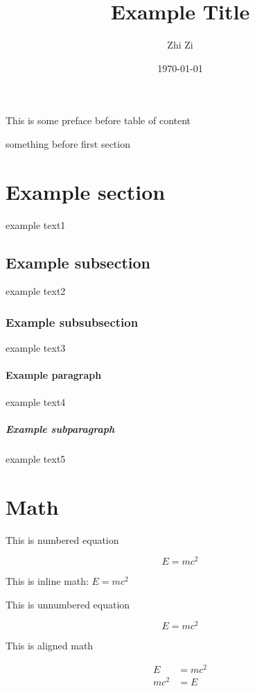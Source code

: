 \documentclass{article}
\title{Example Title}
\author{Zhi Zi}
\date{\today}
\begin{document}
\maketitle

This is some preface before table of content

\tableofcontents

something before first section

\section{Example section}

example text1

\subsection{Example subsection}

example text2

\subsubsection{Example subsubsection}

example text3

\paragraph{Example paragraph}

example text4

\subparagraph{Example subparagraph}

example text5

\section{Math}

This is numbered equation

\begin{equation}
	E = m c^2
\end{equation}

This is inline math: \( E = mc^2 \)

This is unnumbered equation

\begin{equation*}
	E = mc^2
\end{equation*}

This is aligned math

\begin{equation}
	\begin{aligned}
		E    & = mc^2 \\
		mc^2 & = E    \\
	\end{aligned}
\end{equation}
\end{document}
